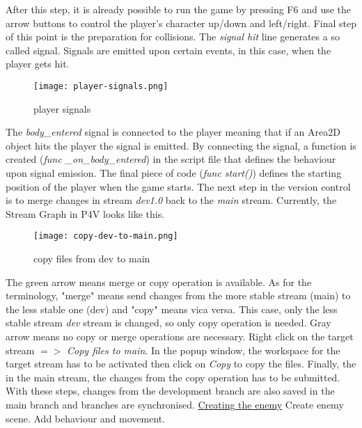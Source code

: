   After this step, it is already possible to run the game by pressing F6 and use the arrow buttons to control the player's
  character up/down and left/right.
  Final step of this point is the preparation for collisions. The \textit{signal hit} line generates a so called signal.
  Signals are emitted upon certain events, in this case, when the player gets hit.
  \begin{figure}[H]
    \centering
    \texttt{[image: player-signals.png]}
    \caption{player signals}
    \label{fig:player-signals}
  \end{figure}
  The \textit{body\_entered} signal is connected to the player meaning that if an Area2D object hits the player the signal
  is emitted. By connecting the signal, a function is created (\textit{func \_on\_body\_entered}) in the script file that defines the behaviour upon signal
  emission. The final piece of code (\textit{func start()}) defines the starting position of the player when the game starts.
The next step in the version control is to merge changes in stream \textit{dev1.0} back to the \textit{main} stream. Currently,
the Stream Graph in P4V looks like this.
\begin{figure}[H]
  \centering
  \texttt{[image: copy-dev-to-main.png]}
  \caption{copy files from dev to main}
  \label{fig:copy-dev-to-main}
\end{figure}
The green arrow means merge or copy operation is available. As for the terminology, "merge" means send changes from the 
more stable stream (main) to the less stable one (dev) and "copy" means vica versa. This case, only the less stable stream
\textit{dev} stream is changed, so only copy operation is needed. Gray arrow means no copy or merge operations are necessary.
Right click on the target stream {$=>$} \textit{Copy files to main}. In the popup window, the workspace for the target stream
has to be activated then click on \textit{Copy} to copy the files. Finally, the in the main stream, the changes from the 
copy operation has to be submitted. With these steps, changes from the development branch are also saved in the main branch
and branches are synchronised.
  \href{https://docs.godotengine.org/en/stable/getting_started/first_2d_game/04.creating_the_enemy.html}{\color{blue}Creating the enemy}
  Create enemy scene. Add behaviour and movement.
